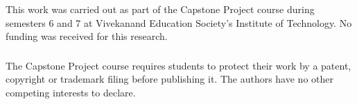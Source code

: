 \ifbibtexrefs
\ifanonymous\else
\begin{credits}
\subsubsection{\ackname} This work was carried out as part of the Capstone Project course during semesters 6 and 7 at
Vivekanand Education Society's Institute of Technology. No funding was received for this research.
\subsubsection{\discintname} The Capstone Project course requires students to protect their work by a patent, copyright or
trademark filing before publishing it. The authors have no other competing interests to declare.
\end{credits}
\fi


\else

